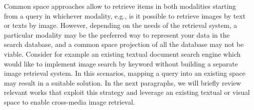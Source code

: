 Common space approaches allow to retrieve items in both modalities starting from a query in whichever modality, e.g., is it possible to retrieve images by text or texts by image.
However, depending on the needs of the retrieval system, a particular modality may be the preferred way to represent your data in the search database, and a common space projection of all the database may not be viable.
Consider for example an existing textual document search engine which would like to implement image search by keyword without building a separate image retrieval system.
In this scenarios, mapping a query into an existing space may result in a suitable solution.
In the next paragraphs, we will briefly review relevant works that exploit this strategy and leverage an existing textual or visual space to enable cross-media image retrieval.

